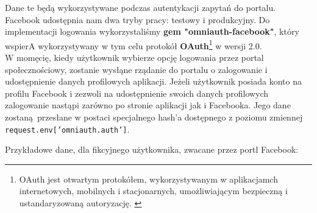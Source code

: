 Dane te będą wykorzystywane podczas autentykacji zapytań do portalu. Facebook udostępnia nam dwa tryby pracy: testowy i produkcyjny. Do implementacji logowania wykorzystaliśmy \textbf{gem "omniauth-facebook"}, który wspierA wykorzystywany w tym celu protokół \textbf{OAuth}\footnote{OAuth jest otwartym protokółem, wykorzystywanym w aplikacjamch internetowych, mobilnych i stacjonarnych, umożliwiającym bezpieczną i ustandaryzowaną autoryzację. \cite{oauth}} w  wersji 2.0.
\\

W momęcię, kiedy użytkownik wybierze opcję logowania przez portal społecznościowy, zostanie wysłąne rządanie do portalu o zalogowanie i udostępnienie danych profilowych aplikacji. Jeżeli użytkownik posiada konto na profilu Facebook i zezwoli na udostępnienie swoich danych profilowych zalogowanie nastąpi zarówno po stronie aplikacji jak i Facebooka. Jego dane zostaną przesłane w postaci specjalnego hash'a dostępnego z poziomu zmiennej \texttt{request.env['omniauth.auth']}.

\clearpage

Przykładowe dane, dla fikcyjnego użytkownika, zwacane przez portl Facebook: \\

